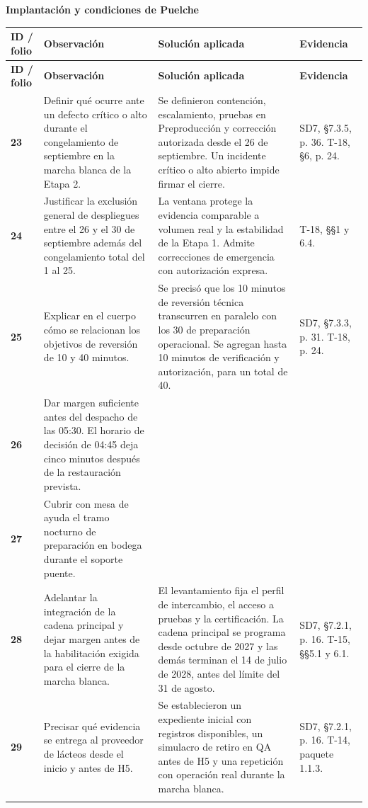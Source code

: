 \documentclass[11pt,letterpaper]{article}
\makeatletter
\newcommand{\tema}[1]{\par{\Large\bfseries #1}\par}
\newcommand{\cabecera}{\rowcolor{fondo}
  \textbf{ID / folio} & \textbf{Observación} & \textbf{Solución aplicada} & \textbf{Evidencia}\\}
\newenvironment{matriz}{%
  \fontsize{10}{13}\selectfont
  \begin{longtable}{@{}>{\RaggedRight\arraybackslash}p{.099\linewidth}
                      >{\RaggedRight\arraybackslash}p{.360\linewidth}
                      >{\RaggedRight\arraybackslash}p{.329\linewidth}
                      >{\RaggedRight\arraybackslash}p{.152\linewidth}@{}}
    \cabecera\endfirsthead
    \cabecera\endhead
}{\end{longtable}\normalsize}
\newcommand{\observacion}[5]{%
  \rule{0pt}{2.3ex}\textbf{#1}\newline {\footnotesize #2} &
  #3 & #4 & #5 \\[2pt]\arrayrulecolor{regla}\midrule}
\makeatother
\begin{document}
\newpage
\tema{Implantación y condiciones de Puelche}
\begin{matriz}
\observacion{23}{31, 33}
{Definir qué ocurre ante un defecto crítico o alto durante el congelamiento de septiembre en la marcha blanca de la Etapa 2.}
{Se definieron contención, escalamiento, pruebas en Preproducción y corrección autorizada desde el 26 de septiembre. Un incidente crítico o alto abierto impide firmar el cierre.}
{SD7, §7.3.5, p. 36. T-18, §6, p. 24.}
\observacion{24}{33}
{Justificar la exclusión general de despliegues entre el 26 y el 30 de septiembre además del congelamiento total del 1 al 25.}
{La ventana protege la evidencia comparable a volumen real y la estabilidad de la Etapa 1. Admite correcciones de emergencia con autorización expresa.}
{T-18, §§1 y 6.4.}
\observacion{25}{31}
{Explicar en el cuerpo cómo se relacionan los objetivos de reversión de 10 y 40 minutos.}
{Se precisó que los 10 minutos de reversión técnica transcurren en paralelo con los 30 de preparación operacional. Se agregan hasta 10 minutos de verificación y autorización, para un total de 40.}
{SD7, §7.3.3, p. 31. T-18, p. 24.}
\observacion{26}{32}
{Dar margen suficiente antes del despacho de las 05:30. El horario de decisión de 04:45 deja cinco minutos después de la restauración prevista.}{}{}
\observacion{27}{33}
{Cubrir con mesa de ayuda el tramo nocturno de preparación en bodega durante el soporte puente.}{}{}
\observacion{28}{31}
{Adelantar la integración de la cadena principal y dejar margen antes de la habilitación exigida para el cierre de la marcha blanca.}
{El levantamiento fija el perfil de intercambio, el acceso a pruebas y la certificación. La cadena principal se programa desde octubre de 2027 y las demás terminan el 14 de julio de 2028, antes del límite del 31 de agosto.}
{SD7, §7.2.1, p. 16. T-15, §§5.1 y 6.1.}
\observacion{29}{32}
{Precisar qué evidencia se entrega al proveedor de lácteos desde el inicio y antes de H5.}
{Se establecieron un expediente inicial con registros disponibles, un simulacro de retiro en QA antes de H5 y una repetición con operación real durante la marcha blanca.}
{SD7, §7.2.1, p. 16. T-14, paquete 1.1.3.}
\end{matriz}
\end{document}
